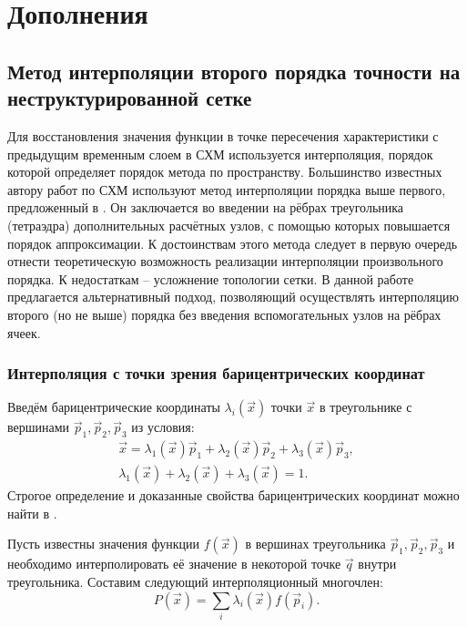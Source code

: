 \section{Дополнения}
\subsection{Метод интерполяции второго порядка точности на неструктурированной сетке}
Для восстановления значения функции в точке пересечения характеристики с предыдущим временным слоем 
в СХМ используется интерполяция, порядок которой определяет порядок метода по пространству. 
Большинство известных автору работ по СХМ используют метод интерполяции порядка выше первого, 
предложенный в \cite{chelnokov_agapov}. 
Он заключается во введении на рёбрах треугольника (тетраэдра) дополнительных расчётных узлов, 
с помощью которых повышается порядок аппроксимации. К достоинствам этого метода следует 
в первую очередь отнести теоретическую возможность реализации интерполяции произвольного порядка. 
К недостаткам -- усложнение топологии сетки. 
В данной работе предлагается альтернативный подход, позволяющий осуществлять интерполяцию 
второго (но не выше) порядка без введения вспомогательных узлов на рёбрах ячеек.  

\subsubsection{Интерполяция с точки зрения барицентрических координат}
Введём барицентрические координаты $\lambda_i(\vec{x})$ точки $\vec{x}$ 
в треугольнике с вершинами $\vec{p}_1, \vec{p}_2, \vec{p}_3$ из условия:
\begin{eqnarray}
	\vec{x} = \lambda_1(\vec{x}) \vec{p}_1 + \lambda_2(\vec{x}) \vec{p}_2 + \lambda_3(\vec{x}) \vec{p}_3, \\
	\lambda_1(\vec{x}) + \lambda_2(\vec{x}) + \lambda_3(\vec{x})  = 1.
\end{eqnarray}
Строгое определение и доказанные свойства барицентрических координат можно найти в \cite{balk_boltyanskiy}. 

Пусть известны значения функции $f(\vec{x})$ в вершинах треугольника $\vec{p}_1, \vec{p}_2, \vec{p}_3$ 
и необходимо интерполировать её значение в некоторой точке $\vec{q}$ внутри треугольника. 
Составим следующий интерполяционный многочлен:
\begin{equation}
P(\vec{x}) = \sum_{i} \lambda_i(\vec{x}) f(\vec{p}_i).
\end{equation}

